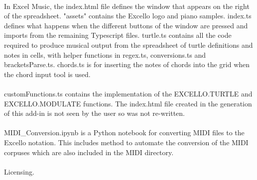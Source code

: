 \paragraph{} In Excel Music, the index.html file defines the window that appears on the right of the spreadsheet. "assets" contains the Excello logo and piano samples. index.ts defines what happens when the different buttons of the window are pressed and imports from the remaining Typescript files. turtle.ts contains all the code required to produce musical output from the spreadsheet of turtle definitions and notes in cells, with helper functions in regex.ts, conversions.ts and bracketsParse.ts. chords.ts is for inserting the notes of chords into the grid when the chord input tool is used.

\paragraph{} customFunctions.ts contains the implementation of the EXCELLO.TURTLE and EXCELLO.MODULATE functions. The index.html file created in the generation of this add-in is not seen by the user so was not re-written.

\paragraph{} MIDI\_Conversion.ipynb is a Python notebook for converting MIDI files to the Excello notation. This includes method to automate the conversion of the MIDI corpuses which are also included in the MIDI directory.

\paragraph{} Licensing.
